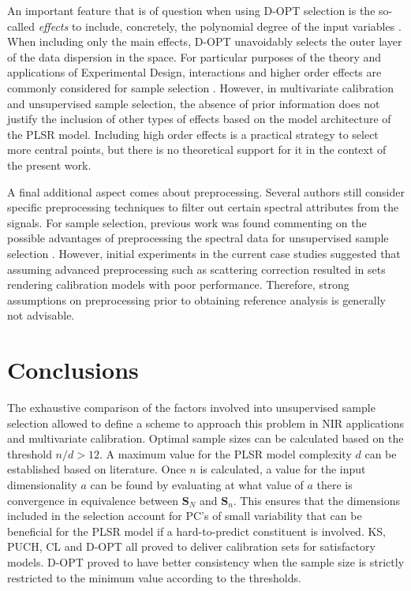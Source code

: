 \documentclass[journal=ancham,manuscript=article]{achemso}
\begin{document}
An important feature that is of question when using D-OPT selection is the so-called \emph{effects} to include, concretely, the polynomial degree of the input variables \cite{Goos2011}. When including only the main effects, D-OPT unavoidably selects the outer layer of the data dispersion in the space. For particular purposes of the theory and applications of Experimental Design, interactions and higher order effects are commonly considered for sample selection \cite{Brandmaier2012}. However, in multivariate calibration and unsupervised sample selection, the absence of prior information does not justify the inclusion of other types of effects based on the model architecture of the PLSR model. Including high order effects is a practical strategy to select more central points, but there is no theoretical support for it in the context of the present work.


A final additional aspect comes about preprocessing. Several authors still consider specific preprocessing techniques to filter out certain spectral attributes from the signals. For sample selection, previous work was found commenting on the possible advantages of preprocessing the spectral data for unsupervised sample selection \cite{Liu2019}. However, initial experiments in the current case studies suggested that assuming advanced preprocessing such as scattering correction resulted in sets rendering calibration models with poor performance. Therefore, strong assumptions on preprocessing prior to obtaining reference analysis is generally not advisable.




\section*{Conclusions}\label{conclusions}

The exhaustive comparison of the factors involved into unsupervised sample selection allowed to define a scheme to approach this problem in NIR applications and multivariate calibration. Optimal sample sizes can be calculated based on the threshold $n/d>12$. A maximum value for the PLSR model complexity $d$ can be established based on literature. Once $n$ is calculated, a value for the input dimensionality $a$ can be found by evaluating at what value of $a$ there is convergence in equivalence between $\mathbf{S}_N$ and $\mathbf{S}_n$. This ensures that the dimensions included in the selection account for PC's of small variability that can be beneficial for the PLSR model if a hard-to-predict constituent is involved. KS, PUCH, CL and D-OPT all proved to deliver calibration sets for satisfactory models. D-OPT proved to have better consistency when the sample size is strictly restricted to the minimum value according to the thresholds. 
\end{document}
